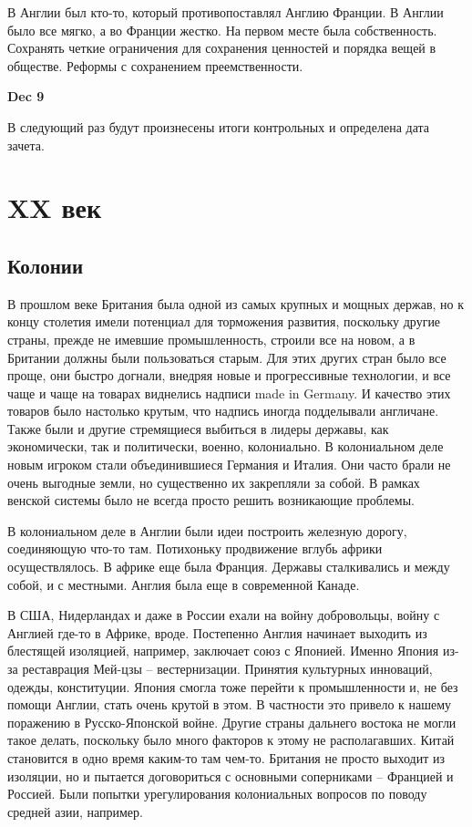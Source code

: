 \documentclass[a4paper, 12pt]{article}
\def\dateis#1{\vspace{\baselineskip}\hfill\textbf{#1}\par}
\begin{document}
\begin{multicols}{2}
В Англии был кто-то, который противопоставлял Англию Франции. В Англии было все мягко, а во Франции жестко. На первом месте была собственность. Сохранять четкие ограничения для сохранения ценностей и порядка вещей в обществе. Реформы с сохранением преемственности. 

\dateis{Dec 9}

В следующий раз будут произнесены итоги контрольных и определена дата зачета.

\section{XX век}

\subsection{Колонии}
В прошлом веке Британия была одной из самых крупных и мощных держав, но к концу столетия имели потенциал для торможения развития, поскольку другие страны, прежде не имевшие промышленность, строили все на новом, а в Британии должны были пользоваться старым. Для этих других стран было все проще, они быстро догнали, внедряя новые и прогрессивные технологии, и все чаще и чаще на товарах виднелись надписи made in Germany. И качество этих товаров было настолько крутым, что надпись иногда подделывали англичане. Также были и другие стремящиеся выбиться в лидеры державы, как экономически, так и политически, военно, колониально. В колониальном деле новым игроком стали объединившиеся Германия и Италия. Они часто брали не очень выгодные земли, но существенно их закрепляли за собой. В рамках венской системы было не всегда просто решить возникающие проблемы.

В колониальном деле в Англии были идеи построить железную дорогу, соединяющую что-то там. Потихоньку продвижение вглубь африки осуществлялось. В африке еще была Франция. Державы сталкивались и между собой, и с местными. Англия была еще в современной Канаде. 

В США, Нидерландах и даже в России ехали на войну добровольцы, войну с Англией где-то в Африке, вроде. Постепенно Англия начинает выходить из блестящей изоляцией, например, заключает союз с Японией. Именно Япония из-за реставрация Мей-цзы -- вестернизации. Принятия культурных инноваций, одежды, конституции. Япония смогла тоже перейти к промышленности и, не без помощи Англии, стать очень крутой в этом. В частности это привело к нашему поражению в Русско-Японской войне. Другие страны дальнего востока не могли такое делать, поскольку было много факторов к этому не располагавших. Китай становится в одно время каким-то там чем-то. Британия не просто выходит из изоляции, но и пытается договориться с основными соперниками -- Францией и Россией. Были попытки урегулирования колониальных вопросов по поводу средней азии, например. 


\end{multicols}
\end{document}
